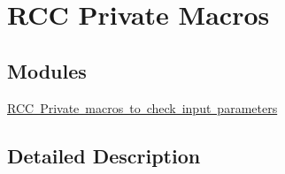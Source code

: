 \hypertarget{group___r_c_c___private___macros}{}\section{R\+CC Private Macros}
\label{group___r_c_c___private___macros}
\subsection*{Modules}
\begin{DoxyCompactItemize}
\item 
\mbox{\hyperlink{group___r_c_c___i_s___r_c_c___definitions}{R\+C\+C Private macros to check input parameters}}
\end{DoxyCompactItemize}


\subsection{Detailed Description}
